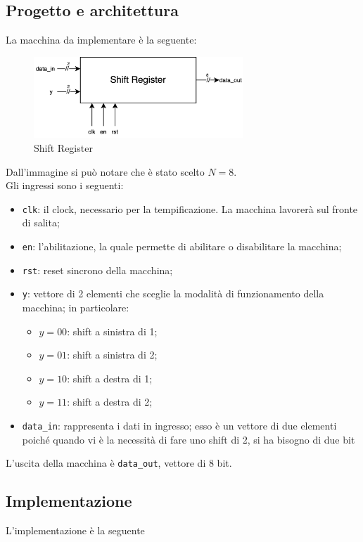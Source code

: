\subsection{Progetto e architettura}
La macchina da implementare è la seguente:
\begin{figure}[H]
	\centering
	\includegraphics[width=0.7\textwidth]{img/shift_register}
	\caption{Shift Register}
	\label{shf_reg} 
\end{figure}
Dall'immagine si può notare che è stato scelto $N=8$.\\
Gli ingressi sono i seguenti:
\begin{itemize}
    \item \texttt{clk}: il clock, necessario per la tempificazione. La macchina lavorerà sul fronte di salita;
    \item \texttt{en}: l'abilitazione, la quale permette di abilitare o disabilitare la macchina;
    \item \texttt{rst}: reset sincrono della macchina;
    \item \texttt{y}: vettore di 2 elementi che sceglie la modalità di funzionamento della macchina; in particolare:
        \begin{itemize}
            \item $y=00$: shift a sinistra di 1;
            \item $y=01$: shift a sinistra di 2;
            \item $y=10$: shift a destra di 1;
            \item $y=11$: shift a destra di 2;
        \end{itemize}
    \item  \texttt{data\_in}: rappresenta i dati in ingresso; esso è un vettore di due elementi poiché quando vi è la necessità di fare uno shift di 2, si ha bisogno di due bit
\end{itemize}
L'uscita della macchina è \texttt{data\_out}, vettore di 8 bit.
\subsection{Implementazione}
L'implementazione è la seguente
\begin{code}
    \inputminted[frame=lines, framesep=2mm, baselinestretch=1.2, bgcolor=LightGray, fontsize=\footnotesize, linenos]{vhdl}{vhdl_files/shift_registrer_beh.vhdl}
    \caption{shift\_register\_beh.vhdl}
    \label{lst:SR_beh}
\end{code}

